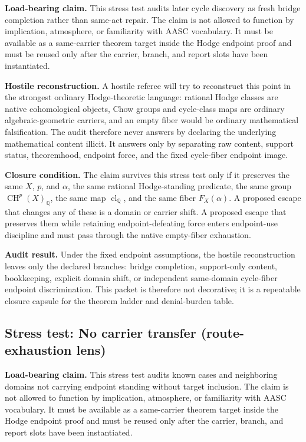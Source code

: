 \documentclass[11pt]{article}
\newcommand{\QQ}{\mathbb{Q}}
\newcommand{\CH}{\operatorname{CH}}
\newcommand{\clQ}{\operatorname{cl}_{\QQ}}
\begin{document}
\par\noindent\textbf{Load-bearing claim.} This stress test audits later cycle discovery as fresh bridge completion rather than same-act repair. The claim is not allowed to function by implication, atmosphere, or familiarity with AASC vocabulary. It must be available as a same-carrier theorem target inside the Hodge endpoint proof and must be reused only after the carrier, branch, and report slots have been instantiated.

\par\noindent\textbf{Hostile reconstruction.} A hostile referee will try to reconstruct this point in the strongest ordinary Hodge-theoretic language: rational Hodge classes are native cohomological objects, Chow groups and cycle-class maps are ordinary algebraic-geometric carriers, and an empty fiber would be ordinary mathematical falsification. The audit therefore never answers by declaring the underlying mathematical content illicit. It answers only by separating raw content, support status, theoremhood, endpoint force, and the fixed cycle-fiber endpoint image.

\par\noindent\textbf{Closure condition.} The claim survives this stress test only if it preserves the same $X$, $p$, and $\alpha$, the same rational Hodge-standing predicate, the same group $\CH^p(X)_\QQ$, the same map $\clQ$, and the same fiber $F_X(\alpha)$. A proposed escape that changes any of these is a domain or carrier shift. A proposed escape that preserves them while retaining endpoint-defeating force enters endpoint-use discipline and must pass through the native empty-fiber exhaustion.

\par\noindent\textbf{Audit result.} Under the fixed endpoint assumptions, the hostile reconstruction leaves only the declared branches: bridge completion, support-only content, bookkeeping, explicit domain shift, or independent same-domain cycle-fiber endpoint discrimination. This packet is therefore not decorative; it is a repeatable closure capsule for the theorem ladder and denial-burden table.


\subsection{Stress test: No carrier transfer (route-exhaustion lens)}

\par\noindent\textbf{Load-bearing claim.} This stress test audits known cases and neighboring domains not carrying endpoint standing without target inclusion. The claim is not allowed to function by implication, atmosphere, or familiarity with AASC vocabulary. It must be available as a same-carrier theorem target inside the Hodge endpoint proof and must be reused only after the carrier, branch, and report slots have been instantiated.
\end{document}
